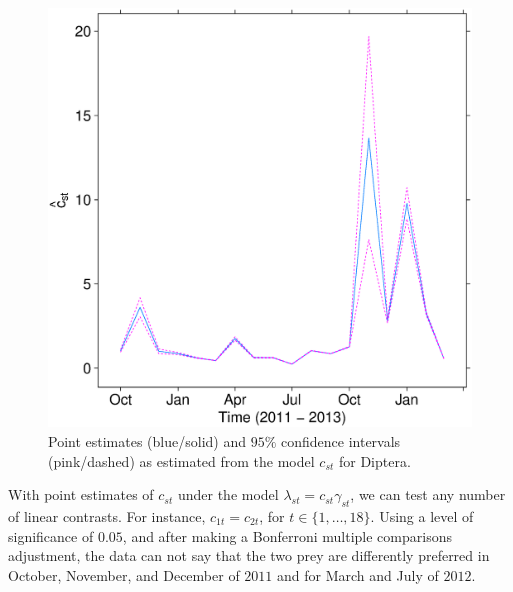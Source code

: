 \begin{figure}
  \centering
  \includegraphics[scale=0.35]{est_dipt}
  \caption{Point estimates (blue/solid) and $95\%$ confidence intervals (pink/dashed) as estimated from the model $c_{st}$ for Diptera.}
  \label{fig:est_dipt}
\end{figure}

With point estimates of $c_{st}$ under the model $\lambda_{st} = c_{st} \gamma_{st}$, we can test any number of linear contrasts.  For instance, $c_{1t} = c_{2t}$, for $t \in \{1, \ldots, 18\}$.  Using a level of significance of $0.05$, and after making a Bonferroni multiple comparisons adjustment, the data can not say that the two prey are differently preferred in October, November, and December of $2011$ and for March and July of $2012$.  



